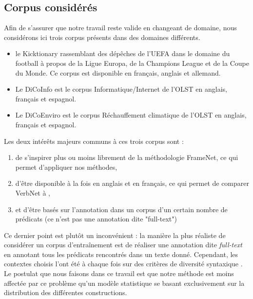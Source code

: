 \subsection{Corpus considérés}

Afin de s'assurer que notre travail reste valide en changeant de domaine, nous
considérons ici trois corpus présents dans des domaines différents.

\begin{itemize}

    \item le Kicktionary \citep{schmidt2006interfacing,schmidt2009kicktionary}
        rassemblant des dépêches de l'UEFA dans le domaine du football à propos
        de la Ligue Europa, de la Champions League et de la Coupe du Monde. Ce
        corpus est disponible en français, anglais et allemand.

    \item Le DiCoInfo est le corpus Informatique/Internet de l'OLST
        \citep{corpusolst} en anglais, français et espagnol.

    \item Le DiCoEnviro est le corpus Réchauffement climatique de l'OLST
        \citep{corpusolst} en anglais, français et espagnol.

\end{itemize}

Les deux intérêts majeurs communs à ces trois corpus sont :

\begin{enumerate}

    \item de s'inspirer plus ou moins librement de la méthodologie FrameNet, ce
        qui permet d'appliquer nos méthodes,

    \item d'être disponible à la fois en anglais et en français, ce qui permet
        de comparer VerbNet à \verbenet{},

    \item et d'être basés sur l'annotation dans un corpus d'un certain nombre
        de prédicats (ce n'est pas une annotation dite "full-text")

\end{enumerate}

Ce dernier point est plutôt un inconvénient : la manière la plus réaliste de
considérer un corpus d'entraînement est de réaliser une annotation dite
\textit{full-text} en annotant tous les prédicats rencontrés dans un texte
donné. Cependant, les contextes choisis l'ont été à chaque fois sur des
critères de diversité syntaxique
\citep{schmidt2006interfacing,lhomme2012adding}. Le postulat que nous faisons
dans ce travail est que notre méthode est moins affectée par ce problème qu'un
modèle statistique se basant exclusivement sur la distribution des différentes
constructions.

